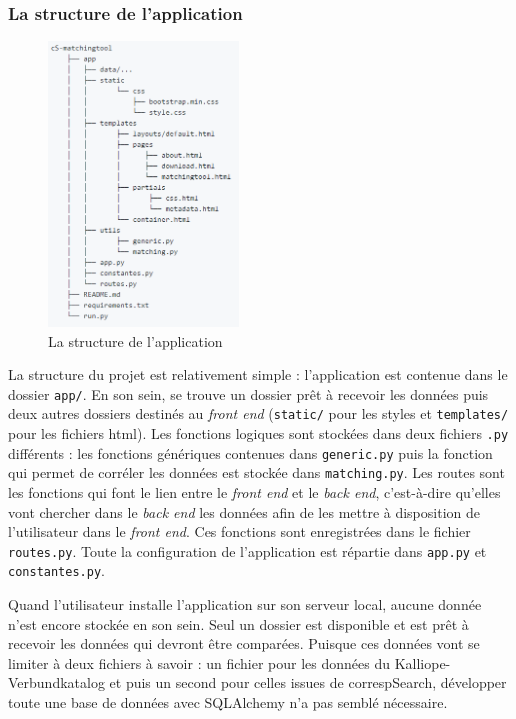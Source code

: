 \documentclass[a4paper, 12pt, twoside]{book}
\begin{document}
\subsubsection{La structure de l'application}
\begin{figure}
\centering
\includegraphics[width=0.45\textwidth]{img/structure_csMatchingTool.png}
\caption{La structure de l'application}
\vspace{-15pt}
\end{figure}
La structure du projet est relativement simple : l'application est contenue dans le dossier \texttt{app/}. En son sein, se trouve un dossier prêt à recevoir les données puis deux autres dossiers destinés au \textit{front end} (\texttt{static/} pour les styles et \texttt{templates/} pour les fichiers \gls{html}). Les fonctions logiques sont stockées dans deux fichiers \texttt{.py} différents : les fonctions génériques contenues dans \texttt{generic.py} puis la fonction qui permet de corréler les données est stockée dans \texttt{matching.py}. Les routes sont les fonctions qui font le lien entre le \textit{front end} et le \textit{back end}, c'est-à-dire qu'elles vont chercher dans le \textit{back end} les données afin de les mettre à disposition de l'utilisateur dans le \textit{front end}. Ces fonctions sont enregistrées dans le fichier \texttt{routes.py}. Toute la configuration de l'application est répartie dans \texttt{app.py} et \texttt{constantes.py}.

Quand l'utilisateur installe l'application sur son serveur local, aucune donnée n'est encore stockée en son sein. Seul un dossier est disponible et est prêt à recevoir les données qui devront être comparées. Puisque ces données vont se limiter à deux fichiers à savoir : un fichier pour les données du Kalliope-Verbundkatalog et puis un second pour celles issues de correspSearch, développer toute une base de données avec SQLAlchemy n'a pas semblé nécessaire. 
\end{document}
